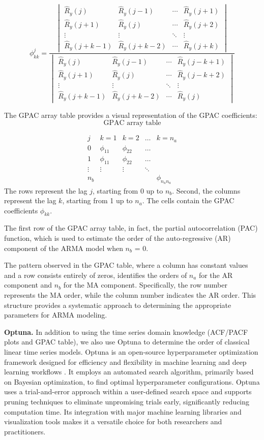 \documentclass{scrartcl}
\begin{document}
\[
\phi_{kk}^j = 
\frac{
\begin{vmatrix}
\hat{R}_y(j) & \hat{R}_y(j-1) & \cdots & \hat{R}_y(j+1) \\
\hat{R}_y(j+1) & \hat{R}_y(j) & \cdots & \hat{R}_y(j+2) \\
\vdots & \vdots & \ddots & \vdots \\
\hat{R}_y(j+k-1) & \hat{R}_y(j+k-2) & \cdots & \hat{R}_y(j+k)
\end{vmatrix}
}{
\begin{vmatrix}
\hat{R}_y(j) & \hat{R}_y(j-1) & \cdots & \hat{R}_y(j-k+1) \\
\hat{R}_y(j+1) & \hat{R}_y(j) & \cdots & \hat{R}_y(j-k+2) \\
\vdots & \vdots & \ddots & \vdots \\
\hat{R}_y(j+k-1) & \hat{R}_y(j+k-2) & \cdots & \hat{R}_y(j)
\end{vmatrix}
}
\]

The GPAC array table  provides a visual representation of the GPAC coefficients:
$$\text{GPAC array table}$$

$$\begin{array}{c|ccccc}
j & k=1 & k=2 & \dots & k=n_a \\
\hline
0 & \phi_{11} & \phi_{22} & \dots & \\
1 & \phi_{11} & \phi_{22} & \dots & \\
\vdots & \vdots & \vdots & \ddots & \\
n_b & & & & \phi_{n_a n_a}
\end{array}$$ The rows represent the lag $j$, starting from 0 up to $n_b$. Second, the columns represent the lag $k$, starting from 1 up to $n_a$. The cells contain the GPAC coefficients $\phi_{kk}$.

The first row of the GPAC array table, in fact, the partial autocorrelation (PAC) function, which is used to estimate the order of the auto-regressive (AR) component of the ARMA model when \( n_b \) = 0.

The pattern observed in the GPAC table, where a column has constant values and a row consists entirely of zeros, identifies the orders of \( n_a \) for the AR component and \( n_b \) for the MA component. Specifically, the row number represents the MA order, while the column number indicates the AR order. This structure provides a systematic approach to determining the appropriate parameters for ARMA modeling.

\textbf{Optuna.}
In addition to using the time series domain knowledge (ACF/PACF plots and GPAC table), we also use Optuna to determine the order of classical linear time series models. Optuna is an open-source hyperparameter optimization framework designed for efficiency and flexibility in machine learning and deep learning workflows \cite{akiba2019optuna}. It employs an automated search algorithm, primarily based on Bayesian optimization, to find optimal hyperparameter configurations. Optuna uses a trial-and-error approach within a user-defined search space and supports pruning techniques to eliminate unpromising trials early, significantly reducing computation time. Its integration with major machine learning libraries and visualization tools makes it a versatile choice for both researchers and practitioners.  
\end{document}
